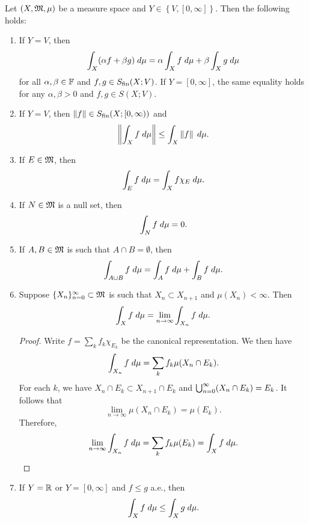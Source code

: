 \documentclass[a4paper]{article}
\begin{document}
\begin{prop}
  Let $(X, \mathfrak{M}, \mu)$ be a measure space and 
  $Y \in \left\{ V, [0, \infty] \right\}$.
  Then the following holds: 
  \begin{enumerate}
    \item If $Y = V$, then 
    \[
      \int_X (\alpha f + \beta g) \; d \mu 
      = \alpha \int_X f \; d \mu + \beta \int_X
      g \; d \mu
    \]
    for all $\alpha, \beta \in \mathbb{F}$ and 
    $f, g \in S_{\text{fin}}(X ; V)$. 
    If $Y = [0, \infty]$, the same equality holds 
    for any $\alpha, \beta > 0$ and $f, g \in S(X; V)$.

    \item If $Y = V$, then 
    $\left\lVert f\right\rVert \in S_{\text{fin}}(X; [0, \infty))$ 
    and 
    \[
      \left\lVert \int_X f \; d\mu\right\rVert \leq \int_X \left\lVert f\right\rVert \; d\mu.
    \]
    
    \item If $E \in \mathfrak{M}$, then 
    \[
      \int_E f \; d \mu = \int_X f \chi_E \; d \mu.
    \]

    \item If $N \in \mathfrak{M}$ is a null set, then 
    \[
      \int_N f \; d \mu = 0.
    \]

    \item If $A, B \in \mathfrak{M}$ is such that 
    $A \cap B = \emptyset$,
    then 
    \[
    \int_{A \cup B} f \; d\mu = \int_A f \; d\mu
    + \int_B f \; d\mu.
    \]

    \item Suppose $\{ X_n \}_{n=0}^\infty \subset \mathfrak{M}$ is such that 
    $X_n \subset X_{n+1}$ and $\mu(X_n) < \infty$. 
    Then 
    \[
      \int_X f \; d \mu = \lim_{n \to \infty} 
      \int_{X_n} f \; d\mu.
    \]

    \begin{proof}
      Write $f = \sum_k f_k \chi_{E_k}$ be the canonical 
      representation. We then have 
      \[
      \int_{X_n} f \; d\mu = \sum_k f_k \mu(X_n \cap E_k).
      \]
      For each $k$, we have 
      $X_n \cap E_k \subset X_{n+1} \cap E_k$ and 
      $\bigcup_{n=0}^\infty (X_n \cap E_k) = E_k$. 
      It follows that
      \[
        \lim_{n \to \infty} \mu(X_n \cap E_k) 
        = \mu(E_k).
      \]
      Therefore, 
      \[
      \lim_{n \to \infty} \int_{X_n} f \; d\mu
      = \sum_k f_k \mu(E_k) = \int_X f \; d\mu.
      \]

    \end{proof}

    \item If $Y = \mathbb{R}$ or $Y = [0, \infty]$ and 
    $f \leq g$ a.e., then 
    \[
    \int_X f \; d\mu \leq \int_X g \; d\mu.
    \]
  \end{enumerate}
\end{prop}
\end{document}
